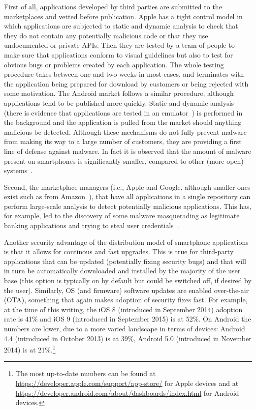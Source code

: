 First of all, applications developed by third parties are submitted to the marketplaces and vetted before publication. Apple has a tight control model in which applications are subjected to static and dynamic analysis to check that they do not contain any potentially malicious code or that they use undocumented or private APIs. Then they are tested by a team of people to make sure that applications conform to visual guidelines but also to test for obvious bugs or problems created by each application. The whole testing procedure takes between one and two weeks in most cases, and terminates with the application being prepared for download by customers or being rejected with some motivation. The Android market follows a similar procedure, although applications tend to be published more quickly. Static and dynamic analysis (there is evidence that applications are tested in an emulator~\cite{googlebouncer,bouncerdissect}) is performed in the background and the application is pulled from the market should anything malicious be detected. Although these mechanisms do not fully prevent malware from making its way to a large number of customers, they are providing a first line of defense against malware. In fact it is observed that the amount of malware present on smartphones is significantly smaller, compared to other (more open) systems~\cite{lever-ndss13,truong13}.

Second, the marketplace managers (i.e., Apple and Google, although smaller ones exist such as from Amazon~\cite{amazonappstore}), that have all applications in a single repository can perform large-scale analysis to detect potentially malicious applications. This has, for example, led to the discovery of some malware masquerading as legitimate banking applications and trying to steal user credentials~\cite{droid09}.

Another security advantage of the distribution model of smartphone applications is that it allows for continous and fast upgrades. This is true for third-party applications that can be updated (potentially fixing security bugs) and that will in turn be automatically downloaded and installed by the majority of the user base (this option is typically on by default but could be switched off, if desired by the user). Similarly, OS (and firmware) software updates are enabled over-the-air (OTA), something that again makes adoption of security fixes fast. For example, at the time of this writing, the iOS 8 (introduced in September 2014) adoption rate is 41\% and iOS 9 (introduced in September 2015) is at 52\%. On Android the numbers are lower, due to a more varied landscape in terms of devices: Android 4.4 (introduced in October 2013) is at 39\%, Android 5.0 (introduced in November 2014) is at 21\%.\footnote{The most up-to-date numbers can be found at \url{https://developer.apple.com/support/app-store/} for Apple devices and at \url{https://developer.android.com/about/dashboards/index.html} for Android devices.}

